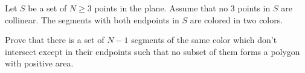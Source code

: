 Let $S$ be a set of $N \ge 3$ points in the plane. Assume that no $3$ points in $S$ are collinear. The segments with both endpoints in $S$ are colored in two colors.

Prove that there is a set of $N - 1$ segments of the same color which don't intersect except in their endpoints such that no subset of them forms a polygon with positive area.